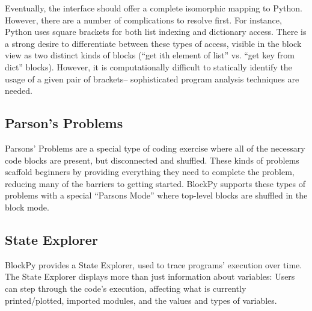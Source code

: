 \documentclass[10pt, conference, compsocconf]{IEEEtran}
\begin{document}
Eventually, the interface should offer a complete isomorphic mapping to Python.
However, there are a number of complications to resolve first.
For instance, Python uses square brackets for both list indexing and dictionary access.
There is a strong desire to differentiate between these types of access, visible in the block view as two distinct kinds of blocks (``get ith element of list'' vs. ``get key from dict'' blocks).
However, it is computationally difficult to statically identify the usage of a given pair of brackets-- sophisticated program analysis techniques are needed.

\subsection{Parson's Problems}

Parsons' Problems are a special type of coding exercise where all of the necessary code blocks are present, but disconnected and shuffled.
These kinds of problems scaffold beginners by providing everything they need to complete the problem, reducing many of the barriers to getting started.
BlockPy supports these types of problems with a special ``Parsons Mode'' where top-level blocks are shuffled in the block mode.



\subsection{State Explorer}

BlockPy provides a State Explorer, used to trace programs' execution over time.
The State Explorer displays more than just information about variables:
Users can step through the code's execution, affecting what is currently printed/plotted, imported modules, and the values and types of variables.

\end{document}
